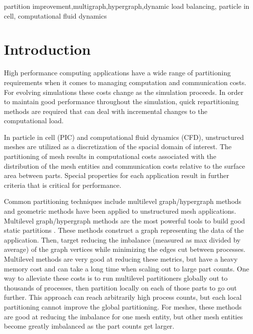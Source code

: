 \documentclass[conference]{IEEEtran}
\begin{document}
\begin{IEEEkeywords}
partition improvement,multigraph,hypergraph,dynamic load balancing,
particle in cell, computational fluid dynamics
\end{IEEEkeywords}

\section{Introduction}

High performance computing applications have a wide range of partitioning requirements when
it comes to managing computation and communication costs. For evolving simulations these
costs change as the simulation proceeds. In order to maintain good performance throughout the
simulation, quick repartitioning methods are required that can deal with incremental changes
to the computational load.

In particle in cell (PIC) and computational fluid dynamics (CFD), unstructured meshes are utilized
as a discretization of the spacial domain of interest. The partitioning of mesh results in
computational costs associated with the distribution of the mesh entities and communication
costs relative to the surface area between parts. Special properties for each application
result in further criteria that is critical for performance.

Common partitioning techniques include multilevel graph/hypergraph methods
and geometric methods have been applied to unstructured mesh applications. Multilevel
graph/hypergraph methods are the most powerful tools to build good static partitions
\cite{catalyurek2013umpa,karypis1999parallel,lasalle2013multi,schloegel2002parallel}.
These methods construct a graph representing the data of the application. Then, target
reducing the imbalance (measured as max divided by average) of the graph vertices while
minimizing the edges cut between processes. Multilevel methods are very good at reducing
these metrics, but have a heavy memory cost and can take a long time when scaling out to large
part counts. One way to alleviate these costs is to run multilevel partitioners globally
out to thousands of processes, then partition locally on each of those parts to go out
further. This approach can reach arbitrarily high process counts, but each
local partitioning cannot improve the global partitioning. For meshes, these methods
are good at reducing the imbalance for one mesh entity,
but other mesh entities become greatly imbalanced as the part counts get larger.
\end{document}
